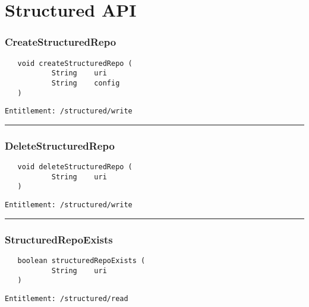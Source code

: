 \chapter{Structured API}

\subsection{CreateStructuredRepo}
\label{Api:CreateStructuredRepo}
\begin{verbatim}
   void createStructuredRepo (
           String    uri
           String    config
   )
\end{verbatim}
\begin{Verbatim}[fontsize=\small, formatcom=\color{Maroon}]
  Entitlement: /structured/write
\end{Verbatim}



\rule{12cm}{2pt}
\subsection{DeleteStructuredRepo}
\label{Api:DeleteStructuredRepo}
\begin{verbatim}
   void deleteStructuredRepo (
           String    uri
   )
\end{verbatim}
\begin{Verbatim}[fontsize=\small, formatcom=\color{Maroon}]
  Entitlement: /structured/write
\end{Verbatim}



\rule{12cm}{2pt}
\subsection{StructuredRepoExists}
\label{Api:StructuredRepoExists}
\begin{verbatim}
   boolean structuredRepoExists (
           String    uri
   )
\end{verbatim}
\begin{Verbatim}[fontsize=\small, formatcom=\color{Maroon}]
  Entitlement: /structured/read
\end{Verbatim}



